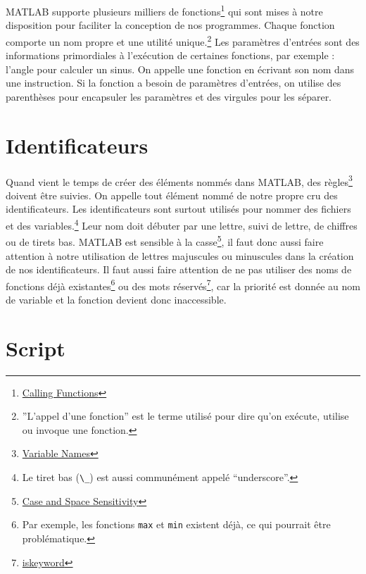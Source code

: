 \documentclass[]{tufte-handout}
\newcommand{\passthrough}[1]{#1}
\begin{document}
MATLAB supporte plusieurs milliers de fonctions\footnote{\href{https://www.mathworks.com/help/matlab/learn_matlab/calling-functions.html}{Calling
  Functions}} qui sont mises à notre disposition pour faciliter la
conception de nos programmes. Chaque fonction comporte un nom propre et
une utilité unique.\footnote{''L'appel d'une fonction'' est le terme
  utilisé pour dire qu'on exécute, utilise ou invoque une fonction.} Les
paramètres d'entrées sont des informations primordiales à l'exécution de
certaines fonctions, par exemple : l'angle pour calculer un sinus. On
appelle une fonction en écrivant son nom dans une instruction. Si la
fonction a besoin de paramètres d'entrées, on utilise des parenthèses
pour encapsuler les paramètres et des virgules pour les séparer.

\hypertarget{identificateurs}{%
\section{Identificateurs}\label{identificateurs}}

Quand vient le temps de créer des éléments nommés dans MATLAB, des
règles\footnote{\href{https://www.mathworks.com/help/matlab/matlab_prog/variable-names.html}{Variable
  Names}} doivent être suivies. On appelle tout élément nommé de notre
propre cru des identificateurs. Les identificateurs sont surtout
utilisés pour nommer des fichiers et des variables.\footnote{Le tiret
  bas (\passthrough{\lstinline!\_!}) est aussi communément appelé
  ``underscore''.} Leur nom doit débuter par une lettre, suivi de
lettre, de chiffres ou de tirets bas. MATLAB est sensible à la
casse\footnote{\href{https://www.mathworks.com/help/matlab/matlab_prog/case-and-space-sensitivity.html}{Case
  and Space Sensitivity}}, il faut donc aussi faire attention à notre
utilisation de lettres majuscules ou minuscules dans la création de nos
identificateurs. Il faut aussi faire attention de ne pas utiliser des
noms de fonctions déjà existantes\footnote{Par exemple, les fonctions
  \passthrough{\lstinline!max!} et \passthrough{\lstinline!min!}
  existent déjà, ce qui pourrait être problématique.} ou des mots
réservés\footnote{\href{https://www.mathworks.com/help/matlab/ref/iskeyword.html}{iskeyword}},
car la priorité est donnée au nom de variable et la fonction devient
donc inaccessible.

\hypertarget{script}{%
\section{Script}\label{script}}
\end{document}
